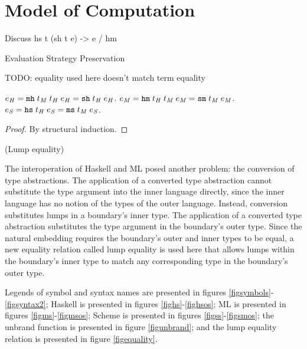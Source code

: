 \section{Model of Computation}



Discuss hs t (sh t e) -> e / hm

\begin{theorem}{Evaluation Strategy Preservation}

TODO: equality used here doesn't match term equality

\label{thmstr}
$e_{\mathit{H}} = \mathtt{mh} \; t_{\mathit{M}} \; t_{\mathit{H}} \; e_{\mathit{H}} = \mathtt{sh} \; t_{\mathit{H}} \; e_{\mathit{H}}$.
$e_{\mathit{M}} = \mathtt{hm} \; t_{\mathit{H}} \; t_{\mathit{M}} \; e_{\mathit{M}} = \mathtt{sm} \; t_{\mathit{M}} \; e_{\mathit{M}}$.
$e_{\mathit{S}} = \mathtt{hs} \; t_{\mathit{H}} \; e_{\mathit{S}} = \mathtt{ms} \; t_{\mathit{M}} \; e_{\mathit{S}}$.
\begin{proof}
By structural induction.
\end{proof}
\end{theorem}

(Lump equality) 

The interoperation of Haskell and ML posed another problem: the conversion of type abstractions. The application of a converted type abstraction cannot substitute the type argument into the inner language directly, since the inner language has no notion of the types of the outer language. Instead, conversion substitutes lumps in a boundary's inner type. The application of a converted type abstraction substitutes the type argument in the boundary's outer type. Since the natural embedding \cite{matthews07} requires the boundary's outer and inner types to be equal, a new equality relation called lump equality is used here that allows lumps within the boundary's inner type to match any corresponding type in the boundary's outer type.

Legends of symbol and syntax names are presented in figures \ref{figsymbols}-\ref{figsyntax2}; Haskell is presented in figures \ref{fighs}-\ref{fighsos}; ML is presented in figures \ref{figms}-\ref{figmsos}; Scheme is presented in figures \ref{figss}-\ref{figsmos}; the unbrand function is presented in figure \ref{figunbrand}; and the lump equality relation is presented in figure \ref{figequality}.

\clearpage



\clearpage



\clearpage

